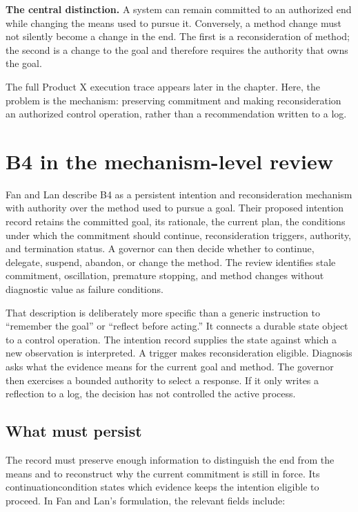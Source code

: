 \begin{notebox}
\textbf{The central distinction.} A system can remain committed to an authorized end while changing the means used to pursue it. Conversely, a method change must not silently become a change in the end. The first is a reconsideration of method; the second is a change to the goal and therefore requires the authority that owns the goal.
\end{notebox}

The full Product X execution trace appears later in the chapter. Here, the problem is the mechanism: preserving commitment and making reconsideration an authorized control operation, rather than a recommendation written to a log.

\section{B4 in the mechanism-level review}
\label{sec:ch15-b4-review}

Fan and Lan describe B4 as a persistent intention and reconsideration mechanism with authority over the method used to pursue a goal. Their proposed intention record retains the committed goal, its rationale, the current plan, the conditions under which the commitment should continue, reconsideration triggers, authority, and termination status. A governor can then decide whether to continue, delegate, suspend, abandon, or change the method. The review identifies stale commitment, oscillation, premature stopping, and method changes without diagnostic value as failure conditions.

That description is deliberately more specific than a generic instruction to ``remember the goal'' or ``reflect before acting.'' It connects a durable state object to a control operation. The intention record supplies the state against which a new observation is interpreted. A trigger makes reconsideration eligible. Diagnosis asks what the evidence means for the current goal and method. The governor then exercises a bounded authority to select a response. If it only writes a reflection to a log, the decision has not controlled the active process.

\subsection{What must persist}

The record must preserve enough information to distinguish the end from the means and to reconstruct why the current commitment is still in force. Its \gls{continuationcondition} states which evidence keeps the intention eligible to proceed. In Fan and Lan's formulation, the relevant fields include:


